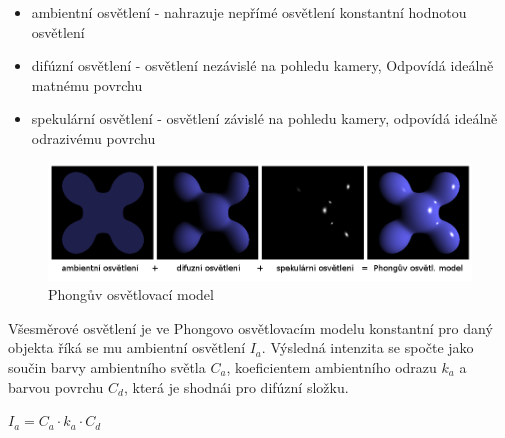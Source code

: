 \documentclass[11pt,twoside,a4paper]{book}
\begin{document}
\begin{itemize}
\item ambientní osvětlení - nahrazuje nepřímé osvětlení konstantní hodnotou osvětlení
\item difúzní osvětlení - osvětlení nezávislé na pohledu kamery, Odpovídá ideálně matnému povrchu
\item spekulární osvětlení - osvětlení závislé na pohledu kamery, odpovídá ideálně odrazivému povrchu
\end{itemize}
\newpage

\begin{center}
\begin{figure}[h!]
\includegraphics[width=150mm]{figures/phong.png}
\caption{Phongův osvětlovací model}
\end{figure}
\end{center}

Všesměrové osvětlení je ve Phongovo osvětlovacím modelu konstantní pro daný objekt\linebreak a říká se mu ambientní osvětlení $I_a$. Výsledná intenzita se spočte jako součin barvy ambientního světla $C_a$, koeficientem ambientního odrazu $k_a$ a barvou povrchu $C_d$, která je shodná\linebreak i pro difúzní složku.
\begin{center}
$I_a = C_a \cdot k_a \cdot C_d$
\end{center}
\end{document}
